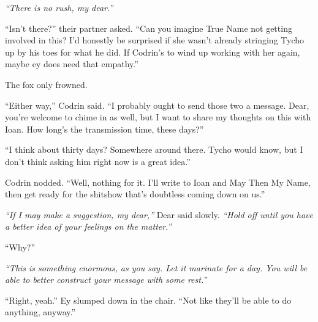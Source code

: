 \emph{``There is no rush, my dear.''}

``Isn't there?'' their partner asked. ``Can you imagine True Name not getting involved in this? I'd honestly be surprised if she wasn't already stringing Tycho up by his toes for what he did. If Codrin's to wind up working with her again, maybe ey does need that empathy.''

The fox only frowned.

``Either way,'' Codrin said. ``I probably ought to send those two a message. Dear, you're welcome to chime in as well, but I want to share my thoughts on this with Ioan. How long's the transmission time, these days?''

``I think about thirty days? Somewhere around there. Tycho would know, but I don't think asking him right now is a great idea.''

Codrin nodded. ``Well, nothing for it. I'll write to Ioan and May Then My Name, then get ready for the shitshow that's doubtless coming down on us.''

\emph{``If I may make a suggestion, my dear,''} Dear said slowly. \emph{``Hold off until you have a better idea of your feelings on the matter.''}

``Why?''

\emph{``This is something enormous, as you say. Let it marinate for a day. You will be able to better construct your message with some rest.''}

``Right, yeah.'' Ey slumped down in the chair. ``Not like they'll be able to do anything, anyway.''

